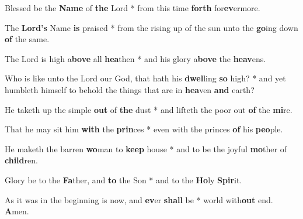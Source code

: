 \begin{multicols}{2}
	Blessed be the \textbf{Name} of \textbf{the} Lord * from this time \textbf{forth} for\textbf{ev}ermore.
	
	The \textbf{Lord's} Name \textbf{is} praised * from the rising up of the sun unto the \textbf{go}ing down \textbf{of} the same.
	
	The Lord is high a\textbf{bove} all \textbf{ hea}then * and his glory a\textbf{bove} the \textbf{heav}ens.
	
	Who is like unto the Lord our God, that hath his \textbf{dwel}ling \textbf{so} high? * and yet humbleth himself to behold the things that are in \textbf{hea}ven \textbf{and} earth?
	
	He taketh up the simple \textbf{out} of \textbf{the} dust * and lifteth the poor out \textbf{of} the \textbf{mi}re.
	
	That he may sit him \textbf{with} the \textbf{prin}ces * even with the princes \textbf{of} his \textbf{peo}ple.
	
	He maketh the barren \textbf{wo}man to \textbf{keep} house * and to be the joyful \textbf{mo}ther of \textbf{child}ren.
	
	Glory be to the \textbf{Fa}ther, and \textbf{to} the Son * and to the \textbf{Ho}ly \textbf{Spir}it.
	
	As it was in the beginning is now, and \textbf{ev}er \textbf{shall} be * world with\textbf{out} end. \textbf{A}men.
\end{multicols}